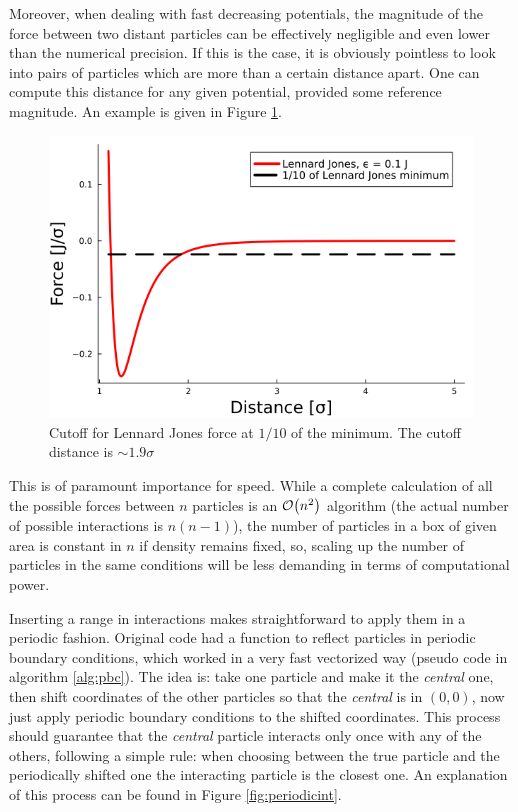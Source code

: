 \documentclass[../../master_thesis_np.tex]{subfiles}
\begin{document}
	{\color{brown}Moreover, when dealing with fast decreasing potentials, the magnitude of the force between two distant particles can be effectively negligible and even lower than the numerical precision.}
	If this is the case, it is obviously pointless to look into pairs of particles which are more than a certain distance apart. 
	One can compute this distance for any given potential, provided some reference magnitude. 
	An example is given in Figure \ref{fig:force_zero}.
	\begin{figure}[htp]
		\centering
		\includegraphics[width=\textwidth]{lj_zero.png}
		\caption{Cutoff for Lennard Jones force at $1/10$ of the minimum. The cutoff distance is $\sim 1.9\sigma$}
		\label{fig:force_zero}
	\end{figure}
	This is of paramount importance for speed. 
	While a complete calculation of all the possible forces between $n$ particles is an $\order{n^2}$ algorithm (the actual number of possible interactions is $n(n-1)$), the number of particles in a box of given area is constant in $n$ if density remains fixed, so, scaling up the number of particles in the same conditions will be less demanding in terms of computational power.
	
	Inserting a range in interactions makes straightforward to apply them in a periodic fashion. 
	Original code had a function to reflect particles in periodic boundary conditions, which worked in a very fast vectorized way (pseudo code in algorithm \ref{alg:pbc}). 
	The idea is: take one particle and make it the \emph{central} one, then shift coordinates of the other particles so that the \emph{central} is in $(0,0)$, now just apply periodic boundary conditions to the shifted coordinates.
	This process should guarantee that the \emph{central} particle interacts only once with any of the others, following a simple rule: when choosing between the true particle and the periodically shifted one the interacting particle is the closest one.
	An explanation of this process can be found in Figure \ref{fig:periodicint}.
	
\end{document}

